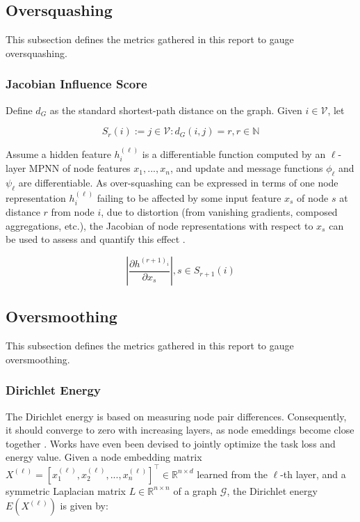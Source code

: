 \documentclass[11pt]{article}
\begin{document}
\subsection{Oversquashing}

This subsection defines the metrics gathered in this report to gauge oversquashing.

\subsubsection{Jacobian Influence Score}
Define $d_G$ as the standard shortest-path distance on the graph. Given $i\in \mathcal{V}$, let

\begin{equation}
    S_r(i):={j\in \mathcal{V} : d_G(i, j)=r}, r \in \mathbb{N}
\end{equation}

Assume a hidden feature $h_i^{(\ell)}$ is a differentiable function computed by an $\ell$-layer MPNN of node features ${x_1,...,x_n}$, and update and message functions $\phi_{\ell}$ and $\psi_{\ell}$ are differentiable. As over-squashing can be expressed in terms of one node representation $h_i^{(\ell)}$ failing to be affected by some input feature $x_s$ of node $s$ at distance $r$ from node $i$, due to distortion (from vanishing gradients, composed aggregations, etc.), the Jacobian of node representations with respect to $x_s$ can be used to assess and quantify this effect \cite{https://doi.org/10.48550/arxiv.2111.14522}. 

\begin{equation}
    \left| \frac{\partial h^{(r + 1)_i}}{\partial x_s} \right|, s \in S_{r+1}(i)
\end{equation}

\subsection{Oversmoothing}

This subsection defines the metrics gathered in this report to gauge oversmoothing. 

\subsubsection{Dirichlet Energy}

The Dirichlet energy is based on measuring node pair differences. Consequently, it should converge to zero with increasing layers, as node emeddings become close together \cite{https://doi.org/10.48550/arxiv.2107.02392}. Works have even been devised to jointly optimize the task loss and energy value. Given a node embedding matrix $X^{(\ell)}=[x_1^{(\ell)}, x_2^{(\ell)}, ..., x_n^{(\ell)}]^\top \in \mathbb{R}^{n\times d}$ learned from the $\ell$-th layer, and a symmetric Laplacian matrix $L \in \mathbb{R}^{n\times n}$ of a graph $\mathcal{G}$, the Dirichlet energy $E(X^{(\ell)})$ is given by:
\end{document}
